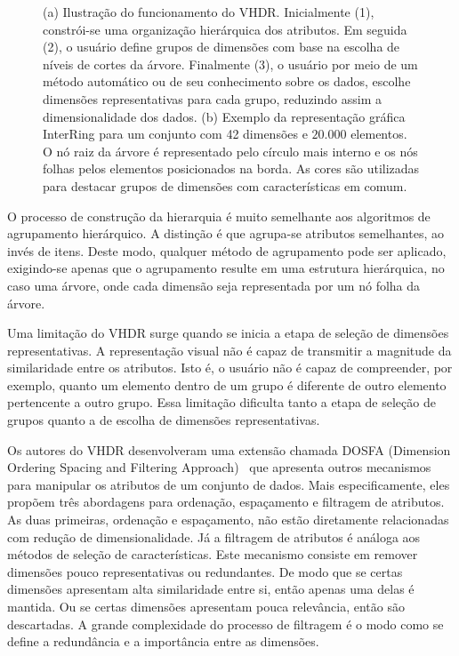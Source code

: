 \begin{figure}[h!]
\begin{subfigure}[b]{0.45\textwidth}
    \caption{}
    \label{fig:vhdr2}
  \end{subfigure}
  \caption[VHDR: Visual Hierarchical Dimension Reduction]{(a) Ilustração do funcionamento do VHDR. Inicialmente (1), constrói-se uma organização hierárquica dos atributos. Em seguida (2), o usuário define grupos de dimensões com base na escolha de níveis de cortes da árvore. Finalmente (3), o usuário por meio de um método automático ou de seu conhecimento sobre os dados, escolhe dimensões representativas para cada grupo, reduzindo assim a dimensionalidade dos dados. (b) Exemplo da representação gráfica InterRing para um conjunto com 42 dimensões e $20.000$ elementos. O nó raiz da árvore é representado pelo círculo mais interno e os nós folhas pelos elementos posicionados na borda. As cores são utilizadas para destacar grupos de dimensões com características em comum.}
\end{figure}

O processo de construção da hierarquia é muito semelhante aos algoritmos de agrupamento hierárquico. A distinção é que agrupa-se atributos semelhantes, ao invés de itens. Deste modo, qualquer método de agrupamento pode ser aplicado, exigindo-se apenas que o agrupamento resulte em uma estrutura hierárquica, no caso uma árvore, onde cada dimensão seja representada por um nó folha da árvore. 

Uma limitação do VHDR surge quando se inicia a etapa de seleção de dimensões representativas. A representação visual não é capaz de transmitir a magnitude da similaridade entre os atributos. Isto é, o usuário não é capaz de compreender, por exemplo, quanto um elemento dentro de um grupo é diferente de outro elemento pertencente a outro grupo. Essa limitação dificulta tanto a etapa de seleção de grupos quanto a de escolha de dimensões representativas.

Os autores do VHDR desenvolveram uma extensão chamada DOSFA (Dimension Ordering Spacing and Filtering Approach)~\cite{DOSFA} que apresenta outros mecanismos para manipular os atributos de um conjunto de dados. Mais especificamente, eles propõem três abordagens para ordenação, espaçamento e filtragem de atributos. As duas primeiras, ordenação e espaçamento, não estão diretamente relacionadas com redução de dimensionalidade. Já a filtragem de atributos é análoga aos métodos de seleção de características. Este mecanismo consiste em remover dimensões pouco representativas ou redundantes. De modo que se certas dimensões apresentam alta similaridade entre si, então apenas uma delas é mantida. Ou se certas dimensões apresentam pouca relevância, então são descartadas. A grande complexidade do processo de filtragem é o modo como se define a redundância e a importância entre as dimensões. 

